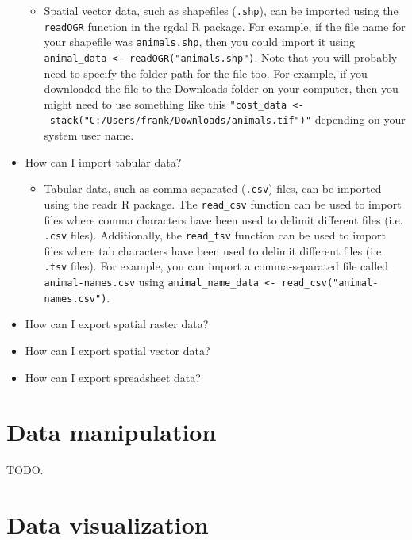 \documentclass[]{book}
\providecommand{\tightlist}{%
  \setlength{\itemsep}{0pt}\setlength{\parskip}{0pt}}
\begin{document}
\begin{itemize}
  \begin{itemize}
  \tightlist
  \item
    Spatial vector data, such as shapefiles (\texttt{.shp}), can be
    imported using the \texttt{readOGR} function in the rgdal R package.
    For example, if the file name for your shapefile was
    \texttt{animals.shp}, then you could import it using
    \texttt{animal\_data\ \textless{}-\ readOGR("animals.shp")}. Note
    that you will probably need to specify the folder path for the file
    too. For example, if you downloaded the file to the Downloads folder
    on your computer, then you might need to use something like this
    \texttt{"cost\_data\ \textless{}-\ stack("C:/Users/frank/Downloads/animals.tif")"}
    depending on your system user name.
  \end{itemize}
\item
  How can I import tabular data?

  \begin{itemize}
  \tightlist
  \item
    Tabular data, such as comma-separated (\texttt{.csv}) files, can be
    imported using the readr R package. The \texttt{read\_csv} function
    can be used to import files where comma characters have been used to
    delimit different files (i.e. \texttt{.csv} files). Additionally,
    the \texttt{read\_tsv} function can be used to import files where
    tab characters have been used to delimit different files (i.e.
    \texttt{.tsv} files). For example, you can import a comma-separated
    file called \texttt{animal-names.csv} using
    \texttt{animal\_name\_data\ \textless{}-\ read\_csv("animal-names.csv")}.
  \end{itemize}
\item
  How can I export spatial raster data?
\item
  How can I export spatial vector data?
\item
  How can I export spreadsheet data?
\end{itemize}

\chapter{Data manipulation}\label{data-manipulation}

TODO.

\chapter{Data visualization}\label{data-visualization}
\end{document}
